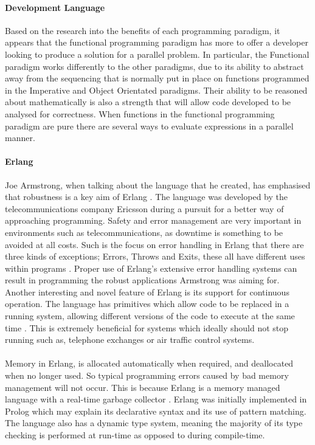 \documentclass[main.tex]{subfiles}
\begin{document}
\paragraph{Development Language}Based on the research into the benefits of each programming paradigm, it appears that the functional programming paradigm has more to offer a developer looking to produce a solution for a parallel problem. In particular, the Functional paradigm works differently to the other paradigms, due to its ability to abstract away from the sequencing that is normally put in place on functions programmed in the Imperative and Object Orientated paradigms. Their ability to be reasoned about mathematically is also a strength that will allow code developed to be analysed for correctness. When functions in the functional programming paradigm are pure there are several ways to evaluate expressions in a parallel manner.

\paragraph{Erlang} Joe Armstrong, when talking about the language that he created, has emphasised that robustness is a key aim of Erlang \cite{Armstrong2009}. The language was developed by the telecommunications company Ericsson during a pursuit for a better way of approaching programming. Safety and error management are very important in environments such as telecommunications, as downtime is something to be avoided at all costs. Such is the focus on error handling in Erlang that there are three kinds of exceptions; Errors, Throws and Exits, these all have different uses within programs \cite{Trottier-Hebert2011}. Proper use of Erlang's extensive error handling systems can result in programming the robust applications Armstrong was aiming for. Another interesting and novel feature of Erlang is its support for continuous operation. The language has primitives which allow code to be replaced in a running system, allowing different versions of the code to execute at the same time \cite{Armstrong1995}. This is extremely beneficial for systems which ideally should not stop running such as, telephone exchanges or air traffic control systems. 

\paragraph{}Memory in Erlang, is allocated automatically when required, and deallocated when no longer used. So typical programming errors caused by bad memory management will not occur. This is because Erlang is a memory managed language with a real-time garbage collector \cite{Armstrong1995}. Erlang was initially implemented in Prolog which may explain its declarative syntax and its use of pattern matching\cite{Armstrong2009}. The language also has a dynamic type system, meaning the majority of its type checking is performed at run-time as opposed to during compile-time.
\end{document}
